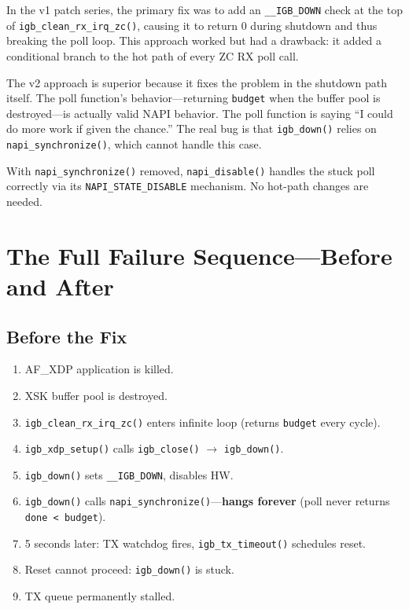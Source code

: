 \documentclass[11pt,a4paper,openany]{book}
\newcommand{\func}[1]{\texttt{#1()}}
\newcommand{\flag}[1]{\texttt{#1}}
\begin{document}
In the v1 patch series, the primary fix was to add an
\flag{\_\_IGB\_DOWN} check at the top of \func{igb\_clean\_rx\_irq\_zc},
causing it to return 0 during shutdown and thus breaking the poll loop.
This approach worked but had a drawback: it added a conditional branch
to the hot path of every ZC RX poll call.

The v2 approach is superior because it fixes the problem in the
shutdown path itself.  The poll function's behavior---returning
\texttt{budget} when the buffer pool is destroyed---is actually valid
NAPI behavior.  The poll function is saying ``I could do more work if
given the chance.''  The real bug is that \func{igb\_down} relies on
\func{napi\_synchronize}, which cannot handle this case.

With \func{napi\_synchronize} removed, \func{napi\_disable} handles
the stuck poll correctly via its \flag{NAPI\_STATE\_DISABLE} mechanism.
No hot-path changes are needed.

\section{The Full Failure Sequence---Before and After}

\subsection{Before the Fix}

\begin{enumerate}
\item AF\_XDP application is killed.
\item XSK buffer pool is destroyed.
\item \func{igb\_clean\_rx\_irq\_zc} enters infinite loop
    (returns \texttt{budget} every cycle).
\item \func{igb\_xdp\_setup} calls \func{igb\_close} $\to$
    \func{igb\_down}.
\item \func{igb\_down} sets \flag{\_\_IGB\_DOWN}, disables HW.
\item \func{igb\_down} calls \func{napi\_synchronize}---\textbf{hangs
    forever} (poll never returns \texttt{done < budget}).
\item 5 seconds later: TX watchdog fires, \func{igb\_tx\_timeout}
    schedules reset.
\item Reset cannot proceed: \func{igb\_down} is stuck.
\item TX queue permanently stalled.
\end{enumerate}
\end{document}
